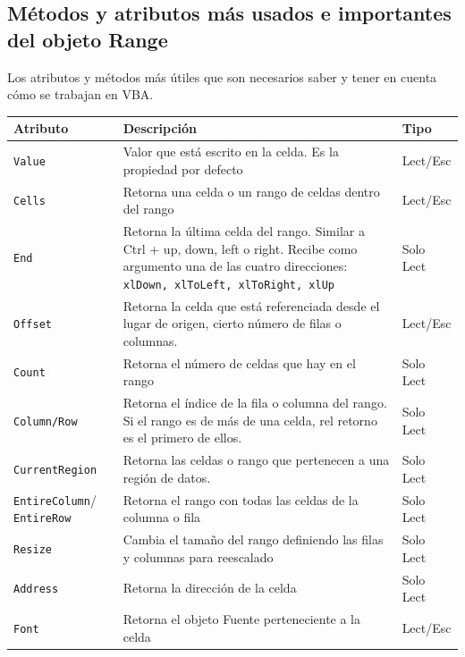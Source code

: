 \subsection{Métodos y atributos más usados e importantes del objeto Range}

Los atributos y métodos más útiles que son necesarios saber y tener en cuenta cómo se trabajan en VBA.

\begin{table}[H]
    \centering
    \begin{tabular}{|m{}|m{}|m{}|}
        \hline
        \rowcolor{lightgray} \textbf{Atributo} & \textbf{Descripción} & \textbf{Tipo} \\ \hline \hline
        \texttt{Value}        & Valor que está escrito en la celda. Es la propiedad por defecto & Lect/Esc \\ \hline
        \texttt{Cells}        & Retorna una celda o un rango de celdas dentro del rango  & Lect/Esc  \\ \hline
        \texttt{End}          & Retorna la última celda del rango. Similar a Ctrl + up, down, left o right. Recibe como argumento una de las cuatro direcciones: \texttt{xlDown, xlToLeft, xlToRight, xlUp} & Solo Lect  \\ \hline
        \texttt{Offset}       & Retorna la celda que está referenciada desde el lugar de origen, cierto número de filas o columnas.  & Lect/Esc  \\ \hline
        \texttt{Count}        & Retorna el número de celdas que hay en el rango  & Solo Lect  \\ \hline
        \texttt{Column/Row}   & Retorna el índice de la fila o columna del rango. Si el rango es de más de una celda, rel retorno es el primero de ellos.  & Solo Lect  \\ \hline
        \texttt{CurrentRegion}& Retorna las celdas o rango que pertenecen a una región de datos.  & Solo Lect  \\ \hline
        \texttt{EntireColumn}/
        \texttt{EntireRow}    & Retorna el rango con todas las celdas de la columna o fila  & Solo Lect \\ \hline
        \texttt{Resize}       & Cambia el tamaño del rango definiendo las filas y columnas para reescalado  & Solo Lect  \\ \hline
        \texttt{Address}      & Retorna la dirección de la celda  & Solo Lect  \\ \hline
        \texttt{Font}         & Retorna el objeto Fuente perteneciente a la celda  & Lect/Esc  \\ \hline

\end{tabular}
\end{table}
